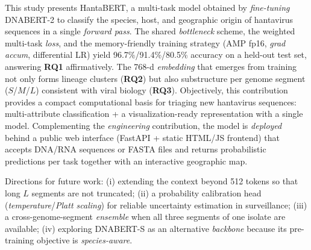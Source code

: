 \documentclass[conference]{IEEEtran}
\begin{document}
This study presents HantaBERT, a multi-task model obtained by
\emph{fine-tuning} DNABERT-2 to classify the species, host, and geographic
origin of hantavirus sequences in a single \emph{forward pass}. The shared
\emph{bottleneck} scheme, the weighted multi-task \emph{loss}, and the
memory-friendly training strategy (AMP fp16, \emph{grad accum},
differential LR) yield 96{.}7\%/91{.}4\%/80{.}5\% accuracy on a held-out
test set, answering \textbf{RQ1} affirmatively. The 768-d
\emph{embedding} that emerges from training not only forms lineage
clusters (\textbf{RQ2}) but also substructure per genome segment
($S$/$M$/$L$) consistent with viral biology (\textbf{RQ3}). Objectively,
this contribution provides a compact computational basis for triaging new
hantavirus sequences: multi-attribute classification + a
visualization-ready representation with a single model. Complementing the
\emph{engineering} contribution, the model is \emph{deployed} behind a
public web interface (FastAPI + static HTML/JS frontend) that accepts
DNA/RNA sequences or FASTA files and returns probabilistic predictions per
task together with an interactive geographic map.

Directions for future work: (i) extending the context beyond 512 tokens so
that long $L$ segments are not truncated; (ii) a probability calibration
head (\emph{temperature}/\emph{Platt scaling}) for reliable uncertainty
estimation in surveillance; (iii) a cross-genome-segment \emph{ensemble}
when all three segments of one isolate are available; (iv) exploring
DNABERT-S as an alternative \emph{backbone} because its pre-training
objective is \emph{species-aware}.
\end{document}
